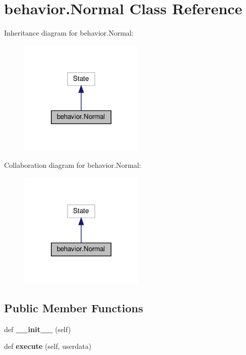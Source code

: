 \hypertarget{classbehavior_1_1Normal}{}\section{behavior.\+Normal Class Reference}
\label{classbehavior_1_1Normal}


Inheritance diagram for behavior.\+Normal\+:
\nopagebreak
\begin{figure}[H]
\begin{center}
\leavevmode
\includegraphics[width=168pt]{classbehavior_1_1Normal__inherit__graph}
\end{center}
\end{figure}


Collaboration diagram for behavior.\+Normal\+:
\nopagebreak
\begin{figure}[H]
\begin{center}
\leavevmode
\includegraphics[width=168pt]{classbehavior_1_1Normal__coll__graph}
\end{center}
\end{figure}
\subsection*{Public Member Functions}
\begin{DoxyCompactItemize}
\item 
\mbox{\label{classbehavior_1_1Normal_a619d7acb40d5b01fde5b55d67702b9ea}} 
def {\bfseries \+\_\+\+\_\+init\+\_\+\+\_\+} (self)
\item 
\mbox{\label{classbehavior_1_1Normal_a9c4d43825ef70e8aa909feb13dea929f}} 
def {\bfseries execute} (self, userdata)
\end{DoxyCompactItemize}


